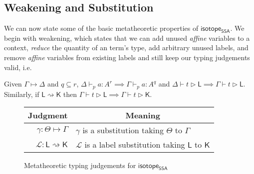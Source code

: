 \documentclass[acmsmall,screen,review]{acmart}
\newcommand{\mc}[1]{\ensuremath{\mathcal{#1}}}
\newcommand{\ms}[1]{\ensuremath{\mathsf{#1}}}
\newcommand{\cwk}[2]{#1 \mapsto #2}
\newcommand{\lwk}[2]{#1 \rightsquigarrow #2}
\newcommand{\hasty}[5]{#1 \vdash_{#2} #3: {#4}^{#5}}
\newcommand{\haslb}[3]{#1 \vdash #2 \rhd #3}
\newcommand{\issubst}[3]{#1: #2 \mapsto #3}
\newcommand{\lbsubst}[3]{#1: #2 \rightsquigarrow #3}
\newcommand{\isotopessa}{\ms{isotope_{SSA}}}
\begin{document}
\subsection{Weakening and Substitution}

We can now state some of the basic metatheoretic properties of \isotopessa. We
begin with weakening, which states that we can add unused \textit{affine} variables to a context,
\textit{reduce} the quantity of an term's type, add arbitrary unused labels, and
remove \textit{affine} variables from existing labels and still keep our typing
judgements valid, i.e.
\begin{lemma}[Weakening] 
  Given \(\cwk{\Gamma}{\Delta}\) and \(q \subseteq r\),
  \(\hasty{\Delta}{p}{a}{A}{r} \implies \hasty{\Gamma}{p}{a}{A}{q}\) and
  \(\haslb{\Delta}{t}{\ms{L}} \implies \haslb{\Gamma}{t}{\ms{L}}\). Similarly,
  if \(\lwk{\ms{L}}{\ms{K}}\) then \(\haslb{\Gamma}{t}{\ms{L}} \implies
  \haslb{\Gamma}{t}{\ms{K}}\).
\end{lemma}

\begin{figure}
  \begin{center}        
    \begingroup
    \renewcommand{\arraystretch}{1.5}
    \setlength{\tabcolsep}{2em}
    \begin{tabular}{rl}
        \multicolumn{1}{c}{Judgment} & \multicolumn{1}{c}{Meaning} \\ \hline
        \(\issubst{\gamma}{\Theta}{\Gamma}\) &
        \(\gamma\) is a substitution taking \(\Theta\) to \(\Gamma\) \\
        \(\lbsubst{\mc{L}}{\ms{L}}{\ms{K}}\) &
        \(\mc{L}\) is a label substitution taking \(\ms{L}\) to \(\ms{K}\)
    \end{tabular}
    \endgroup
  \end{center}
  \caption{Metatheoretic typing judgements for \isotopessa}
  \label{fig:ssa-meta-judgements}
\end{figure}
\end{document}
